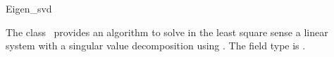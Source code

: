 \begin{ccRefClass}{Eigen_svd}

\ccDefinition
  
The class \ccRefName\ provides an algorithm to solve in the least
square sense a linear system with a singular value decomposition using
\ccThirdPartyEigen. The field type is .


\ccIsModel
{}

\end{ccRefClass}


